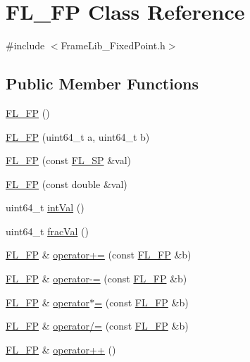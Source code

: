 \hypertarget{class_f_l___f_p}{}\section{F\+L\+\_\+\+FP Class Reference}
\label{class_f_l___f_p}


{\ttfamily \#include $<$Frame\+Lib\+\_\+\+Fixed\+Point.\+h$>$}

\subsection*{Public Member Functions}
\begin{DoxyCompactItemize}
\item 
\hyperlink{class_f_l___f_p_a2db44ca3f010e72af1a0ba97f443fe93}{F\+L\+\_\+\+FP} ()
\item 
\hyperlink{class_f_l___f_p_ac233226f5a38c1180b00965cda0b2ba1}{F\+L\+\_\+\+FP} (uint64\+\_\+t a, uint64\+\_\+t b)
\item 
\hyperlink{class_f_l___f_p_ae69dbbbcee3563f7ff4e3102dd137c05}{F\+L\+\_\+\+FP} (const \hyperlink{struct_f_l___s_p}{F\+L\+\_\+\+SP} \&val)
\item 
\hyperlink{class_f_l___f_p_a552b545bb667d5a6436e89f33586e9fa}{F\+L\+\_\+\+FP} (const double \&val)
\item 
uint64\+\_\+t \hyperlink{class_f_l___f_p_a0ce00ef24ad45d942501781061b423a8}{int\+Val} ()
\item 
uint64\+\_\+t \hyperlink{class_f_l___f_p_a4d17ff88a771402857fa22e94e502efe}{frac\+Val} ()
\item 
\hyperlink{class_f_l___f_p}{F\+L\+\_\+\+FP} \& \hyperlink{class_f_l___f_p_ab07d8c341752a6668a3a8a6e0d8ba2c7}{operator+=} (const \hyperlink{class_f_l___f_p}{F\+L\+\_\+\+FP} \&b)
\item 
\hyperlink{class_f_l___f_p}{F\+L\+\_\+\+FP} \& \hyperlink{class_f_l___f_p_a494e954f36fbfd791dfc2117e0de4baa}{operator-\/=} (const \hyperlink{class_f_l___f_p}{F\+L\+\_\+\+FP} \&b)
\item 
\hyperlink{class_f_l___f_p}{F\+L\+\_\+\+FP} \& \hyperlink{class_f_l___f_p_a04123cec30a145c37cfdaa2030ecba5e}{operator$\ast$=} (const \hyperlink{class_f_l___f_p}{F\+L\+\_\+\+FP} \&b)
\item 
\hyperlink{class_f_l___f_p}{F\+L\+\_\+\+FP} \& \hyperlink{class_f_l___f_p_a2bbae2b6138642ae4cf90eb7b3a1ea5f}{operator/=} (const \hyperlink{class_f_l___f_p}{F\+L\+\_\+\+FP} \&b)
\item 
\hyperlink{class_f_l___f_p}{F\+L\+\_\+\+FP} \& \hyperlink{class_f_l___f_p_a883f8d6a0d34a3af9a35654b25f0ba7c}{operator++} ()

\end{DoxyCompactItemize}
